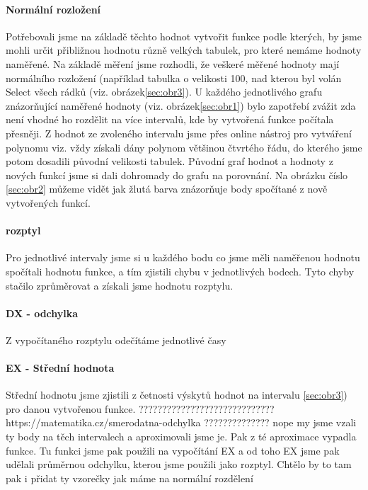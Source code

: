 \documentclass[a4paper, 11pt]{article}
\begin{document}
\paragraph{Normální rozložení} Potřebovali jsme na základě těchto hodnot vytvořit funkce podle kterých, by jsme mohli určit přibližnou hodnotu různě velkých tabulek, pro které nemáme hodnoty naměřené. Na základě měření jsme rozhodli, že veškeré měřené hodnoty mají normálního rozložení (například tabulka o velikosti 100, nad kterou byl volán Select všech rádků (viz. obrázek\ref{sec:obr3}).
U každého jednotlivého grafu znázorňující naměřené hodnoty (viz. obrázek\ref{sec:obr1}) bylo zapotřebí zvážit zda není vhodné ho rozdělit na více intervalů, kde by  vytvořená funkce počítala přesněji. Z hodnot ze zvoleného intervalu jsme přes online nástroj pro vytváření polynomu viz. \cite{polregres} vždy získali dány polynom většinou čtvrtého řádu, do kterého jsme potom dosadili původní velikosti tabulek. Původní graf hodnot a hodnoty z nových funkcí jsme si dali dohromady do grafu na porovnání. Na obrázku číslo \ref{sec:obr2} můžeme vidět jak žlutá barva znázorňuje body spočítané z nově vytvořených funkcí. 

\paragraph{rozptyl} Pro jednotlivé intervaly jsme si u každého bodu co jsme měli naměřenou hodnotu spočítali hodnotu funkce, a tím zjistili chybu v jednotlivých bodech. Tyto chyby stačilo zprůměrovat a získali jsme hodnotu rozptylu. 
\paragraph{DX - odchylka} Z vypočítaného rozptylu odečítáme jednotlivé časy 
\paragraph{EX - Střední hodnota} Střední hodnotu jsme zjistili z četnosti výskytů hodnot na intervalu \ref{sec:obr3}) pro danou vytvořenou funkce.
 ????????????????????????????? 
https://matematika.cz/smerodatna-odchylka
??????????????
nope my jsme vzali ty body na těch intervalech a aproximovali jsme je. Pak z té aproximace vypadla funkce. Tu funkci jsme pak použili na vypočítání EX a od toho EX jsme pak udělali průměrnou odchylku, kterou jsme použili jako rozptyl.
Chtělo by to tam pak i přidat ty vzorečky jak máme
na normální rozdělení
\end{document}
